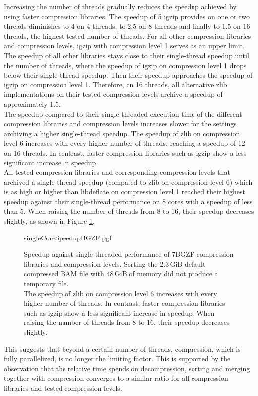 Increasing the number of threads gradually reduces the speedup achieved by using faster compression libraries. The speedup of 5 igzip provides on one or two threads diminishes to 4 on 4 threads, to 2.5 on 8 threads and finally to 1.5 on 16 threads, the highest tested number of threads. For all other compression libraries and compression levels, igzip with compression level 1 serves as an upper limit. The speedup of all other libraries stays close to their single-thread speedup until the number of threads, where the speedup of igzip on compression level 1 drops below their single-thread speedup. Then their speedup approaches the speedup of igzip on compression level 1. Therefore, on 16 threads, all alternative zlib implementations on their tested compression levels archive a speedup of approximately 1.5. \\
The speedup compared to their single-threaded execution time of the different compression libraries and compression levels increases slower for the settings archiving a higher single-thread speedup. The speedup of zlib on compression level 6 increases with every higher number of threads, reaching a speedup of 12 on 16 threads. In contrast, faster compression libraries such as igzip show a less significant increase in speedup. \\
All tested compression libraries and corresponding compression levels that archived a single-thread speedup (compared to zlib on compression level 6) which is as high or higher than libdeflate on compression level 1 reached their highest speedup against their single-thread performance on 8 cores with a speedup of less than 5. When raising the number of threads from 8 to 16, their speedup decreases slightly, as shown in Figure \ref{fig:bgzfSngleCoreSpeedup}. \\
\begin{figure}[!htb]
        {singleCoreSpeedupBGZF.pgf}
    \caption{Speedup against single-threaded performance of 7BGZF compression libraries and compression levels. Sorting the 2.3\,GiB default compressed BAM file with 48\,GiB of memory did not produce a temporary file. \\
    The speedup of zlib on compression level 6 increases with every higher number of threads. In contrast, faster compression libraries such as igzip show a less significant increase in speedup. When raising the number of threads from 8 to 16, their speedup decreases slightly.}
    \label{fig:bgzfSngleCoreSpeedup}
\end{figure}
This suggests that beyond a certain number of threads, compression, which is fully parallelized, is no longer the limiting factor. This is supported by the observation that the relative time \sort spends on decompression, sorting and merging together with compression converges to a similar ratio for all compression libraries and tested compression levels. \\

